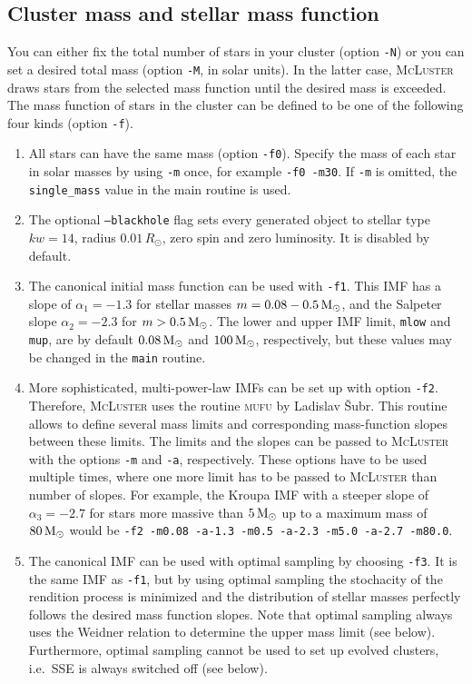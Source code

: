 \documentclass[useAMS,usenatbib]{mn2e}
\newcommand{\msun}{\mbox{$\,{\rm M}_\odot$}}
\begin{document}
\subsection*{Cluster mass and stellar mass function}
You can either fix the total number of stars in your cluster (option \texttt{-N}) or you can set a desired total mass (option \texttt{-M}, in solar units). In the latter case, \textsc{McLuster} draws stars from the selected mass function until the desired mass is exceeded. The mass function of stars in the cluster can be defined to be one of the following four kinds (option \texttt{-f}).
\begin{enumerate}
\item All stars can have the same mass (option \texttt{-f0}). Specify the mass of each star in solar masses by using \texttt{-m} once, for example \texttt{-f0 -m30}. If \texttt{-m} is omitted, the \texttt{single\_mass} value in the main routine is used.
\item The optional \texttt{--blackhole} flag sets every generated object to stellar type $kw=14$, radius $0.01\,R_\odot$, zero spin and zero luminosity. It is disabled by default.
\item The canonical \citet{Kroupa01} initial mass function can be used with \texttt{-f1}. This IMF has a slope of $\alpha_1 = -1.3$ for stellar masses $m = 0.08 - 0.5 \msun$, and the Salpeter slope
$\alpha_2 = -2.3$ for $m > 0.5 \msun$. The lower and upper IMF limit, \texttt{mlow} and \texttt{mup}, are by default $0.08\msun$ and $100\msun$, respectively, but these values may be changed in the \texttt{main} routine. 
\item More sophisticated, multi-power-law IMFs can be set up with option \texttt{-f2}. Therefore, \textsc{McLuster} uses the routine \textsc{mufu} by Ladislav {\v S}ubr. This routine allows to define several mass limits and corresponding mass-function slopes between these limits. The limits and the slopes can be passed to \textsc{McLuster} with the options \texttt{-m} and \texttt{-a}, respectively. These options have to be used multiple times, where one more limit has to be passed to \textsc{McLuster} than number of slopes. For example, the Kroupa IMF with a steeper slope of $\alpha_3 = -2.7$ for stars more massive than $5\msun$ up to a maximum mass of $80\msun$ would be \texttt{-f2 -m0.08 -a-1.3 -m0.5 -a-2.3 -m5.0 -a-2.7 -m80.0}.
\item The canonical IMF can be used with optimal sampling \citep{Kroupa11} by choosing \texttt{-f3}. It is the same IMF as \texttt{-f1}, but by using optimal sampling the stochacity of the rendition process is minimized and the distribution of stellar masses perfectly follows the desired mass function slopes. Note that optimal sampling always uses the Weidner relation to determine the upper mass limit (see below). Furthermore, optimal sampling cannot be used to set up evolved clusters, i.e.~\textsc{SSE} is always switched off (see below).

\end{enumerate}
\end{document}
